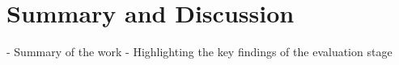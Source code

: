 \chapter{Summary and Discussion}
\label{ch:summary}



- Summary of the work
- Highlighting the key findings of the evaluation stage